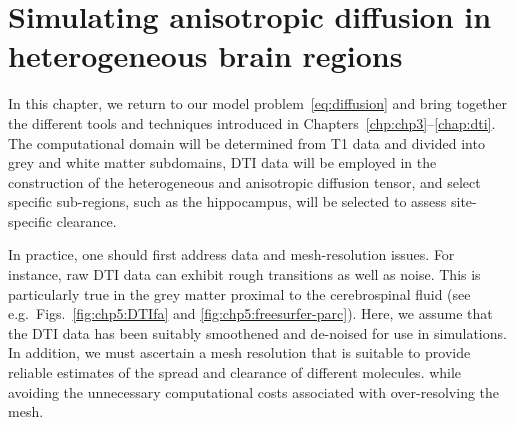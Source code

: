 \chapter{Simulating anisotropic diffusion in heterogeneous brain regions}
\label{chp:chp6}

In this chapter, we return to our model problem~\eqref{eq:diffusion}
and bring together the different tools and techniques introduced in
Chapters~\ref{chp:chp3}--\ref{chap:dti}. The computational domain will
be determined from T1 data and divided into grey and white matter
subdomains, DTI data will be employed in the construction of the
heterogeneous and anisotropic diffusion tensor, and select specific
sub-regions, such as the hippocampus, will be selected to assess
site-specific clearance.




In practice, one should first address data and mesh-resolution
issues. For instance, raw DTI data can exhibit rough transitions as
well as noise. This is particularly true in the grey matter proximal
to the cerebrospinal fluid (see e.g.~Figs.~\ref{fig:chp5:DTIfa} and
\ref{fig:chp5:freesurfer-parc}). Here, we assume that the DTI data has
been suitably smoothened and de-noised for use in simulations. In
addition, we must ascertain a mesh resolution that is suitable to
provide reliable estimates of the spread and clearance of different
molecules. while avoiding the unnecessary computational costs
associated with over-resolving the mesh.

